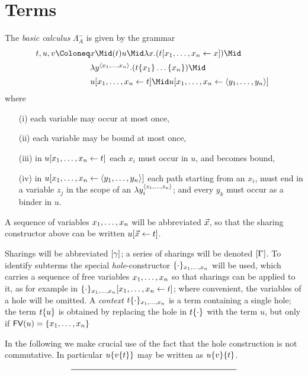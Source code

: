 \documentclass{amsart}
\begin{document}
\section*{Terms}

\begin{definition}
\label{def:basic calculus}
The \emph{basic calculus} $\Lambda_A^-$ is given by the grammar
%
\setMidspace{6pt}
%
\[
\begin{array}{@{}r@{}l@{~}l@{}}
        t,u,v \Coloneq &
x
\Mid		(t)u
\Mid            \lambda x.(t\share xx)
\Mid\\[5pt] &   \lambda y^{\tup x}.(t\cxt*{x_1}\ldots\cxt*{x_n})
\Mid\\[5pt] &   u\share xt
\Mid            u\share x{\tup y}
\end{array}
\]
%
where
\begin{itemize}
	\item[(i)] each variable may occur at most once, 
	\item[(ii)] each variable may be bound at most once,
	\item[(iii)] in $u\share xt$ each $x_i$ must occur in $u$, and becomes
                bound,
        \item[(iv)] in $u\share x{\tup y}$ each path starting from an $x_i$,
                must end in a variable $z_j$ in the scope of an $\lambda
                y_i^{\tup z}$; and every $y_k$ must occur as a binder in $u$.
\end{itemize}
\end{definition}


A sequence of variables $\vv x$ will be abbreviated $\vv*x$, so that the sharing constructor above can be written $u\share*{\vv*x}t$.

Sharings will be abbreviated $\g$; a series of sharings will be denoted $\G$.
%
To identify subterms the special \emph{hole}-constructor $\cxt[\vv x]$ will be
used, which carries a sequence of free variables $\vv x$ so that sharings can be
applied to it, as for example in $\cxt[\vv x]\share xt$; where convenient, the
variables of a hole will be omitted.
%
A \emph{context} $t\cxt[\vv x]$ is a term containing a single hole; the term $t\cxt*u$ is obtained by replacing the hole in $t\cxt$ with the term $u$, but only if $\FV(u)=\{\vv x\}$

In the following we make crucial use of the fact that the hole construction is
not commutative. In particular $u\cxt*{v\cxt*t}$ may be written as $u\cxt*v\cxt*t$.

\[
	\rule{200pt}{.5pt}
\]
\end{document}
